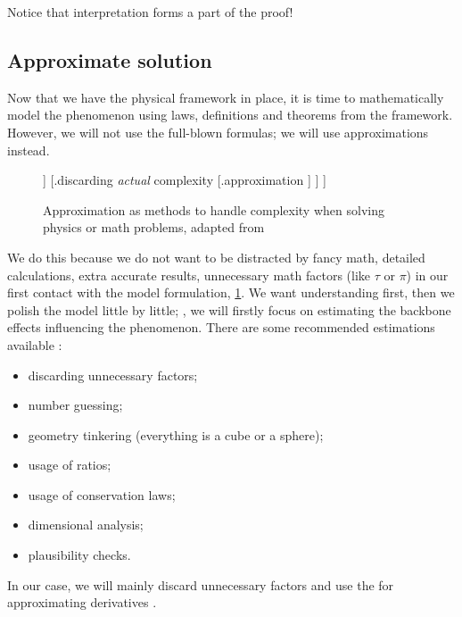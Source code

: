 Notice that interpretation forms a part of the proof!


\subsection{Approximate solution}
%
Now that we have the physical framework in place, it is time to mathematically model the phenomenon using laws, definitions and theorems from the framework. However, we will not use the full-blown formulas; we will use approximations instead.
%
%
%
\begin{figure}[bt]
  \capstart
  \begin{center}
  \footnotesize
    \Tree [.{how to handle complexity} 
            [.{discarding \emph{fake} complexity (symmetry)} 
              [.{dimensional analysis} ]
            ] 
            [.{discarding \emph{actual} complexity} 
              [.{approximation} ] 
            ]
           ]
  \normalsize
  \end{center}
  \caption[Handling complexity, again]
    {Approximation as methods to handle complexity when solving physics or math problems, adapted from \cite[p. 2]{sanjoy:2008}}
  \label{fig:handlingcomplexitytwo}
\end{figure}
%

We do this because we do not want to be distracted by fancy math, detailed calculations, extra accurate results, unnecessary math factors (like $\tau$ or $\pi$) in our first contact with the model formulation, \vide \cref{fig:handlingcomplexitytwo}. We want understanding first, then we polish the model little by little; \ie, we will firstly focus on estimating the backbone effects influencing the phenomenon. There are some recommended estimations available \cite{francis:1999}:
%
\begin{itemize}
%
\item discarding unnecessary factors;
%
\item number guessing;
%
\item geometry tinkering (everything is a cube or a sphere);
%
\item usage of ratios;
%
\item usage of conservation laws;
%
\item dimensional analysis;
%
\item plausibility checks.
%
\end{itemize}
%
In our case, we will mainly discard unnecessary factors and use the  for approximating derivatives \cite[p. 38]{sanjoy:2010}.

